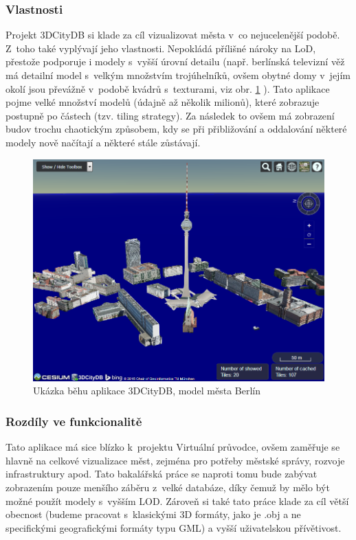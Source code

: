 \documentclass[thesis=B,czech]{FITthesis}[2012/06/26]
\begin{document}
        \subsubsection{Vlastnosti}
        
        Projekt 3DCityDB si klade za cíl vizualizovat města v~co nejucelenější podobě. Z~toho také vyplývají jeho vlastnosti. Nepokládá přílišné nároky na LoD, přestože podporuje i modely s~vyšší úrovní detailu (např. berlínská televizní věž má detailní model s~velkým množstvím trojúhelníků, ovšem obytné domy v~jejím okolí jsou převážně v~podobě kvádrů s~texturami, viz obr. \ref{fig:3DcityDB} ). Tato aplikace pojme velké množství modelů (údajně až několik milionů), které zobrazuje postupně po částech (tzv. tiling strategy). Za následek to ovšem má zobrazení budov trochu chaotickým způsobem, kdy se při přibližování a oddalování některé modely nově načítají a některé stále zůstávají.\cite{3DCityDB}
        
        \begin{figure}
  		\includegraphics[width=\textwidth,height=\textheight,keepaspectratio]{3dcitydb.png}
  		\caption{Ukázka běhu aplikace 3DCityDB, model města Berlín}
  		\label{fig:3DcityDB}
	\end{figure}
        
        \subsubsection{Rozdíly ve funkcionalitě}
        
        Tato aplikace má sice blízko k~projektu Virtuální průvodce, ovšem zaměřuje se hlavně na celkové vizualizace měst, zejména pro potřeby městské správy, rozvoje infrastruktury apod. Tato bakalářská práce se naproti tomu bude zabývat zobrazením pouze menšího záběru z~velké databáze, díky čemuž by mělo být možné použít modely s~vyšším LOD. Zároveň si také tato práce klade za cíl větší obecnost (budeme pracovat s~klasickými 3D formáty, jako je .obj a ne specifickými geografickými formáty typu GML) a vyšší uživatelskou přívětivost.
\end{document}
